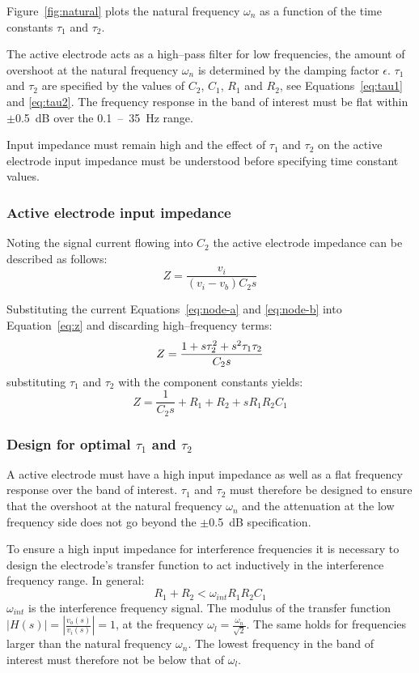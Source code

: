 Figure~\vref{fig:natural} plots the natural frequency $\omega_n$ as a
function of the time constants $\tau_1$ and $\tau_2$.

The active electrode acts as a high--pass filter for low frequencies,
the amount of overshoot at the natural frequency $\omega_n$ is
determined by the damping factor $\epsilon$.  $\tau_1$ and $\tau_2$
are specified by the values of $C_2$, $C_1$, $R_1$ and $R_2$, see
Equations~\ref{eq:tau1} and \ref{eq:tau2}. The frequency response in
the band of interest must be flat within $\pm$0.5~dB over the
0.1~--~35~Hz range.

Input impedance must remain high and the effect of $\tau_1$ and
$\tau_2$ on the active electrode input impedance must be understood
before specifying time constant values.

\subsubsection{Active electrode input impedance}
Noting the signal current flowing into $C_2$ the active electrode
impedance can be described as follows:
\begin{equation}
	Z = \frac{v_i}{(v_i - v_b)C_2s}
	\label{eq:z}
\end{equation}

Substituting the current Equations~\ref{eq:node-a} and \ref{eq:node-b}
into Equation~\ref{eq:z} and discarding high--frequency terms:
\begin{equation}
	Z = \frac{1 + s\tau_2^2 + s^2\tau_1\/\tau_2}{C_2s}
	\label{eq:z-long}
\end{equation}
substituting $\tau_1$ and $\tau_2$ with the component constants
yields:
\begin{equation}
	Z = \frac{1}{C_2s} + R_1 + R_2 + sR_1R_2C_1
	\label{eq:z-long2}
\end{equation}


\subsubsection{Design for optimal $\tau_1$ and $\tau_2$}
A active electrode must have a high input impedance as well as a flat
frequency response over the band of interest. $\tau_1$ and $\tau_2$
must therefore be designed to ensure that the overshoot at the natural
frequency $\omega_n$ and the attenuation at the low frequency side
does not go beyond the $\pm$0.5~dB specification.

To ensure a high input impedance for interference frequencies it is
necessary to design the electrode's transfer function to act
inductively in the interference frequency range. In general:
\begin{equation}
	R_1 + R_2 < \omega_{int}R_1R_2C_1
	\label{eq:wint}
\end{equation}
$\omega_{int}$ is the interference frequency signal. The modulus of
the transfer function $ \left | H(s) \right | = \left |
\frac{v_o(s)}{v_i(s)} \right | = 1$, at the frequency $\omega_l =
\frac{\omega_n}{\sqrt{2}}$. The same holds for frequencies larger than
the natural frequency $\omega_n$. The lowest frequency in the band of
interest must therefore not be below that of $\omega_l$.

